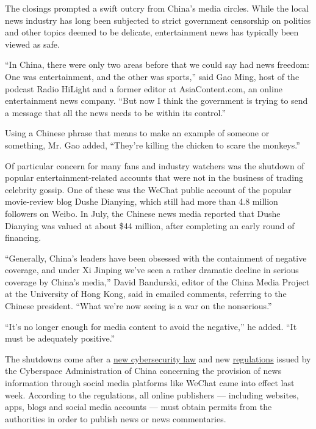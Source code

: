 The closings prompted a swift outcry from China's media circles. While
the local news industry has long been subjected to strict government
censorship on politics and other topics deemed to be delicate,
entertainment news has typically been viewed as safe.

``In China, there were only two areas before that we could say had news
freedom: One was entertainment, and the other was sports,'' said Gao
Ming, host of the podcast Radio HiLight and a former editor at
AsiaContent.com, an online entertainment news company. ``But now I think
the government is trying to send a message that all the news needs to be
within its control.''

Using a Chinese phrase that means to make an example of someone or
something, Mr. Gao added, ``They're killing the chicken to scare the
monkeys.''

Of particular concern for many fans and industry watchers was the
shutdown of popular entertainment-related accounts that were not in the
business of trading celebrity gossip. One of these was the WeChat public
account of the popular movie-review blog Dushe Dianying, which still had
more than 4.8 million followers on Weibo. In July, the Chinese news
media reported that Dushe Dianying was valued at about \$44 million,
after completing an early round of financing.

``Generally, China's leaders have been obsessed with the containment of
negative coverage, and under Xi Jinping we've seen a rather dramatic
decline in serious coverage by China's media,'' David Bandurski, editor
of the China Media Project at the University of Hong Kong, said in
emailed comments, referring to the Chinese president. ``What we're now
seeing is a war on the nonserious.''

``It's no longer enough for media content to avoid the negative,'' he
added. ``It must be adequately positive.''

The shutdowns come after a
\href{https://www.nytimes.com/2017/05/31/business/china-cybersecurity-law.html}{new
cybersecurity law} and new
\href{http://news.xinhuanet.com/2017-05/22/c_1121016109.htm}{regulations}
issued by the Cyberspace Administration of China concerning the
provision of news information through social media platforms like WeChat
came into effect last week. According to the regulations, all online
publishers --- including websites, apps, blogs and social media accounts
--- must obtain permits from the authorities in order to publish news or
news commentaries.

